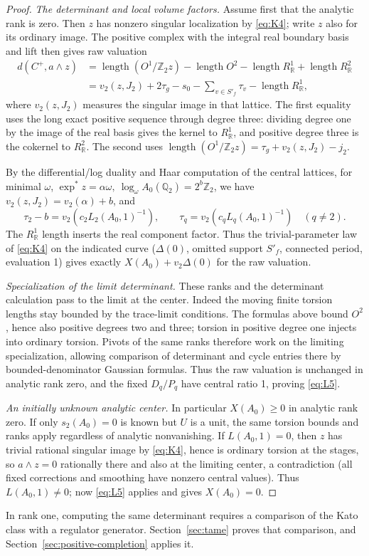 \begin{proof}
\emph{The determinant and local volume factors.}
Assume first that the analytic rank is zero. Then \(z\) has nonzero singular localization by \eqref{eq:K4}; write \(z\) also for its ordinary image. The positive complex with the integral real boundary basis and lift then gives raw valuation
\begin{equation}\label{eq:positive-determinant:raw-center}
 \begin{aligned}
 d(C^+,a\wedge z)
   &=\operatorname{length}(O^1/\mathbb Z_2 z)
       -\operatorname{length}O^2-\operatorname{length}R^1_\mathbb R
                                  +\operatorname{length}R^2_\mathbb R\\
   &=v_2(z,J_2)+2\tau_g-s_0-\sum_{v\in S'_f}\tau_v
                                       -\operatorname{length}R^1_\mathbb R ,
 \end{aligned}
\end{equation}
where \(v_2(z,J_2)\) measures the singular image in that lattice. The first equality uses the long exact positive sequence through degree three: dividing degree one by the image of the real basis gives the kernel to \(R^1_\mathbb R\), and positive degree three is the cokernel to \(R^2_\mathbb R\). The second uses \(\operatorname{length}(O^1/\mathbb Z_2z)=\tau_g+v_2(z,J_2)-j_2\).

By the differential/log duality and Haar computation of the central lattices, for minimal \(\omega\), \(\exp^*z=\alpha\omega,\ \log_\omega A_0(\mathbb Q_2)=2^b\mathbb Z_2\), we have \(v_2(z,J_2)=v_2(\alpha)+b\), and
\[
       \tau_2-b=v_2(c_2 L_2(A_0,1)^{-1}),\qquad
       \tau_q=v_2(c_q L_q(A_0,1)^{-1})\quad(q\ne2).
\]
The \(R^1_\mathbb R\) length inserts the real component factor. Thus the trivial-parameter law of \eqref{eq:K4} on the indicated curve (\(\Delta(0)\), omitted support \(S'_f\), connected period, evaluation 1) gives exactly \(X(A_0)+v_2\Delta(0)\) for the raw valuation. 

\emph{Specialization of the limit determinant.}
These ranks and the determinant calculation pass to the limit at the center. Indeed the moving finite torsion lengths stay bounded by the trace-limit conditions. The formulas above bound \(O^2\), hence also positive degrees two and three; torsion in positive degree one injects into ordinary torsion. Pivots of the same ranks therefore work on the limiting specialization, allowing comparison of determinant and cycle entries there by bounded-denominator Gaussian formulas. Thus the raw valuation is unchanged in analytic rank zero, and the fixed \(D_q/P_q\) have central ratio 1, proving \eqref{eq:L5}.

\emph{An initially unknown analytic center.}
In particular \(X(A_0)\ge0\) in analytic rank zero. If only \(s_2(A_0)=0\) is known but \(U\) is a unit, the same torsion bounds and ranks apply regardless of analytic nonvanishing. If \(L(A_0,1)=0\), then \(z\) has trivial rational singular image by \eqref{eq:K4}, hence is ordinary torsion at the stages, so \(a\wedge z=0\) rationally there and also at the limiting center, a contradiction (all fixed corrections and smoothing have nonzero central values). Thus \(L(A_0,1)\ne0\); now \eqref{eq:L5} applies and gives \(X(A_0)=0\).
\end{proof}

In rank one, computing the same determinant requires a comparison of the Kato class with a regulator generator. Section~\ref{sec:tame} proves that comparison, and Section~\ref{sec:positive-completion} applies it.

